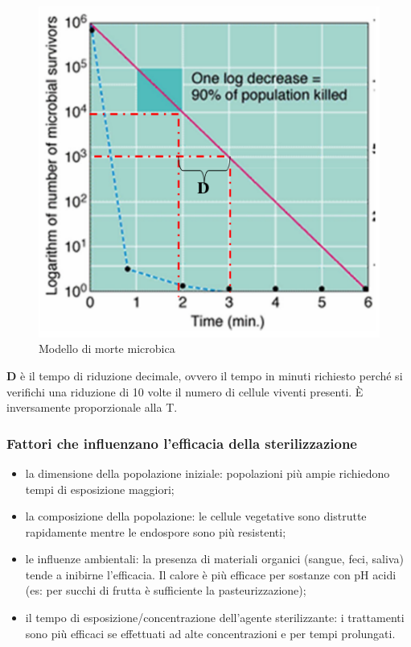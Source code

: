 \documentclass[11pt]{book}
\begin{document}
\clearpage
\begin{figure}[htp]
\centering
\includegraphics[scale=0.5]{img/Modello di morte microbica.png}
\caption{Modello di morte microbica}
\label{}
\end{figure}


\textbf{D} è il tempo di riduzione decimale, ovvero il tempo in minuti richiesto perché si verifichi una riduzione di 10 volte il numero di cellule viventi presenti. \`E inversamente proporzionale alla T.

\subsubsection{Fattori che influenzano l’efficacia della sterilizzazione}
\begin{itemize}
\item la dimensione della popolazione iniziale: popolazioni più ampie richiedono tempi di esposizione maggiori;
\item la composizione della popolazione: le cellule vegetative sono distrutte rapidamente mentre le endospore sono più resistenti;
\item le influenze ambientali: la presenza di materiali organici (sangue, feci, saliva) tende a inibirne l’efficacia. Il calore è più efficace per sostanze con pH acidi (es: per succhi di frutta è sufficiente la pasteurizzazione);
\item il tempo di esposizione/concentrazione dell’agente sterilizzante: i trattamenti sono più efficaci se effettuati ad alte concentrazioni e per tempi prolungati. 
\end{itemize}
\end{document}
